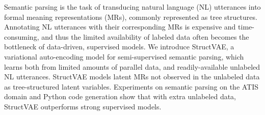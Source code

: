 Semantic parsing is the task of transducing natural language (NL) utterances into formal meaning representations (MRs), commonly represented as tree structures. Annotating NL utterances with their corresponding MRs is expensive and time-consuming, and thus the limited availability of labeled data often becomes the bottleneck of data-driven, supervised models. We introduce StructVAE, a variational auto-encoding model for semi-supervised semantic parsing, which learns both from limited amounts of parallel data, and readily-available unlabeled NL utterances. StructVAE models latent MRs not observed in the unlabeled data as tree-structured latent variables. Experiments on semantic parsing on the ATIS domain and Python code generation show that with extra unlabeled data, StructVAE outperforms strong supervised models.
